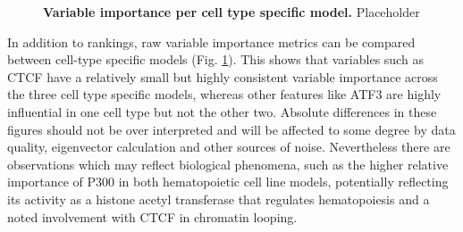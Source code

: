 \documentclass[a4paper,11pt,oneside]{book}
\begin{document}
\begin{figure}
\begin{center} 
\captionsetup{width=\textwidth} 
\caption{ {\bf Variable importance per cell type specific model. }
Placeholder
}\label{fig:varimp_diff}
\end{center} 
\end{figure} 

In addition to rankings, raw variable importance metrics can be compared between cell-type specific models (Fig. \ref{fig:varimp_diff}). This shows that variables such as CTCF have a relatively small but highly consistent variable importance across the three cell type specific models, whereas other features like ATF3 are highly influential in one cell type but not the other two. Absolute differences in these figures should not be over interpreted and will be affected to some degree by data quality, eigenvector calculation and other sources of noise. Nevertheless there are observations which may reflect biological phenomena, such as the higher relative importance of P300 in both hematopoietic cell line models, potentially reflecting its activity as a histone acetyl transferase that regulates hematopoiesis\cite{Sun2015} and a noted involvement with CTCF in chromatin looping.\cite{Handoko2011}
\end{document}
